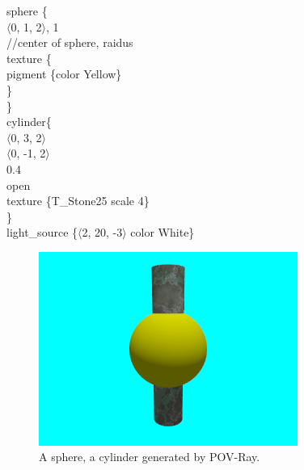 \documentclass[fleqn,10pt]{wlscirep}
\newcommand*{\PV}{POV-Ray}
\begin{document}
\textcolor[rgb]{0.2,0.1,1}{ sphere \{ } \\
\textcolor[rgb]{0.2,0.1,1}{ $\langle$0, 1, 2$\rangle$, 1 } \\
//center of sphere, raidus \\
\textcolor[rgb]{0.2,0.1,1}{texture \{ } \\
\textcolor[rgb]{0.2,0.1,1}{ pigment \{color Yellow\} } \\
\textcolor[rgb]{0.2,0.1,1}{ \} } \\
\textcolor[rgb]{0.2,0.1,1}{ \} } \\

\textcolor[rgb]{0.2,0.1,1}{ cylinder\{ } \\
\textcolor[rgb]{0.2,0.1,1}{ $\langle$0, 3, 2$\rangle$ } \\
\textcolor[rgb]{0.2,0.1,1}{ $\langle$0, -1, 2$\rangle$ } \\
\textcolor[rgb]{0.2,0.1,1}{ 0.4 } \\
\textcolor[rgb]{0.2,0.1,1}{ open } \\
\textcolor[rgb]{0.2,0.1,1}{ texture \{T\_Stone25 scale 4\} } \\
\textcolor[rgb]{0.2,0.1,1}{ \} } \\
\textcolor[rgb]{0.2,0.1,1}{ light\_source \{$\langle$2, 20, -3$\rangle$ color White\} }  \\

\begin{figure}[htbp]
\centering
\includegraphics[width=20pc,clip]{FIG5}
\caption{A sphere, a cylinder generated by \PV.}
\label{fig:FIG5}
\end{figure}
\end{document}
